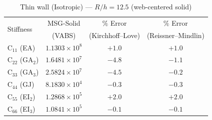 \begin{table}[htpb]
\centering
\caption{Thin wall (Isotropic) --- $R/h = 12.5$ (web-centered solid)}
\label{tab:multicell2_iso_thin}
\begin{tabular}{lccc}
\hline
\multirow{2}{*}{Stiffness} & MSG-Solid & $\%$ Error & $\%$ Error\\
 & (VABS) & (Kirchhoff--Love) & (Reissner--Mindlin) \\
\hline
C$_{11}$ (EA) & $1.1303 \times 10^{8}$ & $+1.0$ & $+1.0$ \\
C$_{22}$ (GA$_2$) & $1.6481 \times 10^{7}$ & $-4.8$ & $-1.1$ \\
C$_{33}$ (GA$_3$) & $2.5824 \times 10^{7}$ & $-4.5$ & $-0.2$ \\
C$_{44}$ (GJ) & $8.1830 \times 10^{4}$ & $-0.3$ & $-0.3$ \\
C$_{55}$ (EI$_2$) & $1.2868 \times 10^{5}$ & $+2.0$ & $+2.0$ \\
C$_{66}$ (EI$_3$) & $1.0841 \times 10^{5}$ & $-0.1$ & $-0.1$ \\
\hline
\end{tabular}
\end{table}
